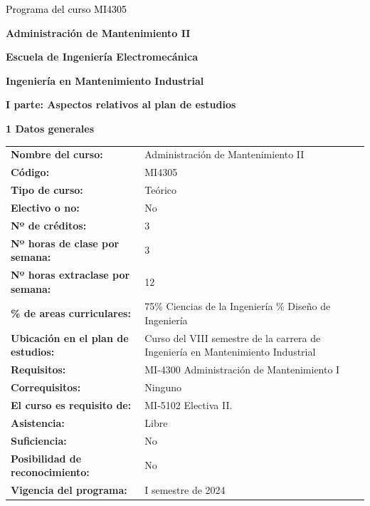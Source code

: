 \documentclass[letterpaper]{article}%
\begin{document}
%
\normalsize%
\thispagestyle{empty}%
%
\vspace*{150mm}%
\par\fontsize{14}{0}\selectfont \textcolor{black}{Programa del curso MI4305}%
\par\fontsize{18}{25}\selectfont \textbf{\textcolor{azulsuaveTEC}{Administración de Mantenimiento II}}%
\par\hspace*{10mm}\fontsize{12}{30}\selectfont \textbf{\textcolor{gris}{Escuela de Ingeniería Electromecánica}}%
\par\hspace*{10mm}\fontsize{12}{14}\selectfont \textbf{\textcolor{gris}{Ingeniería en Mantenimiento Industrial}}%
\newpage%
\pagestyle{headfoot}%
\par\fontsize{14}{0}\selectfont \textbf{\textcolor{parte}{I parte: Aspectos relativos al plan de estudios}}%
\par\hspace*{4mm}\fontsize{12}{20}\selectfont \textbf{\textcolor{parte}{1 Datos generales}}%
\renewcommand{\arraystretch}{1.5}%
\begin{longtable}{m{7cm}m{9cm}}%
\textbf{Nombre del curso:}&Administración de Mantenimiento II\\%
\textbf{Código:}&MI4305\\%
\textbf{Tipo de curso:}&Teórico\\%
\textbf{Electivo o no:}&No\\%
\textbf{Nº de créditos:}&3\\%
\textbf{Nº horas de clase por semana:}&3\\%
\textbf{Nº horas extraclase por semana:}&12\\%
\textbf{\% de areas curriculares:}&75\% Ciencias de la Ingeniería
\newline%
25\% Diseño de Ingeniería\\%
\textbf{Ubicación en el plan de estudios:}&Curso del VIII semestre de la carrera de Ingeniería en 
\newline%
Mantenimiento Industrial\\%
\textbf{Requisitos:}&MI{-}4300 Administración de Mantenimiento I\\%
\textbf{Correquisitos:}&Ninguno\\%
\textbf{El curso es requisito de:}&MI{-}5102 Electiva II.\\%
\textbf{Asistencia:}&Libre\\%
\textbf{Suficiencia:}&No\\%
\textbf{Posibilidad de reconocimiento:}&No\\%
\textbf{Vigencia del programa:}&I semestre de 2024\\%
\end{longtable}%
\end{document}
